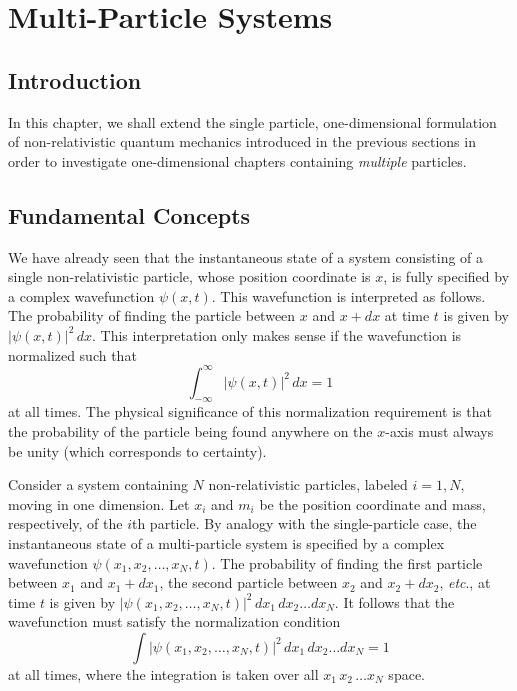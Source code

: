 \chapter{Multi-Particle Systems}\label{smany}
\section{Introduction}
In this chapter, we shall extend the single particle, one-dimensional formulation of non-relativistic 
quantum mechanics introduced in the previous sections in order to investigate one-dimensional chapters containing {\em multiple}\/ particles.

\section{Fundamental Concepts}\label{sfuncon}
We have already seen that the instantaneous
state of a system consisting of a single non-relativistic particle, whose position coordinate
is $x$, is fully specified by
a complex wavefunction $\psi(x,t)$. This wavefunction is interpreted
as follows. The probability of finding the particle between $x$ and
$x+dx$ at time $t$ is given by $|\psi(x,t)|^2\,dx$. This interpretation only makes sense if the wavefunction is
normalized such that
\begin{equation}
\int_{-\infty}^\infty |\psi(x,t)|^2\,dx = 1
\end{equation}
at all times. The physical significance of this normalization requirement is
that the probability of the particle being found anywhere on the $x$-axis
must always be unity (which corresponds to certainty).

Consider a system containing $N$ non-relativistic particles, labeled $i=1, N$, moving in one dimension. Let $x_i$ and $m_i$ be the position coordinate
and mass, respectively, of the $i$th particle.  
By analogy with the single-particle case, the instantaneous state of a multi-particle system is 
specified by a complex wavefunction $\psi(x_1,x_2,\ldots, x_N,t)$.
The probability of finding the first particle between $x_1$ and $x_1+dx_1$,
the second particle between $x_2$ and $x_2+dx_2$, {\em etc}., at time
$t$ is given by $|\psi(x_1,x_2,\ldots, x_N,t)|^2\,dx_1\,dx_2\ldots dx_N$.
It follows that the wavefunction must satisfy the normalization condition
\begin{equation}\label{en1}
\int |\psi(x_1,x_2,\ldots, x_N,t)|^2\,dx_1\,dx_2\ldots dx_N = 1
\end{equation}
at all times, where the integration is taken over all $x_1\,x_2\,\ldots x_N$
space.

